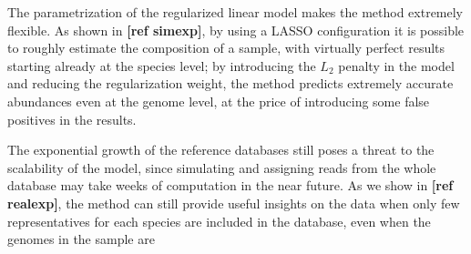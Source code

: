 The parametrization of the regularized linear model makes the method extremely flexible. As shown in \textbf{[ref simexp]}, by using a LASSO configuration it is possible to roughly estimate the composition of a sample, with virtually perfect results starting already at the species level; by introducing the $L_2$ penalty in the model and reducing the regularization weight, the method predicts extremely accurate abundances even at the genome level, at the price of introducing some false positives in the results.

The exponential growth of the reference databases still poses a threat to the scalability of the model, since simulating and assigning reads from the whole database may take weeks of computation in the near future. As we show in \textbf{[ref realexp]}, the method can still provide useful insights on the data when only few representatives for each species are included in the database, even when the genomes in the sample are 
